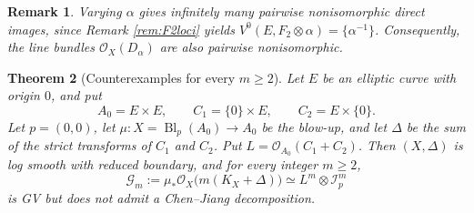 \documentclass[10pt,a4paper]{amsart}
\newtheorem{theorem}{Theorem}[section]
\newtheorem{remark}[theorem]{Remark}
\newcommand{\OO}{\mathcal O}
\newcommand{\GG}{\mathcal G}
\newcommand{\II}{\mathcal I}
\DeclareMathOperator{\Bl}{Bl}
\begin{document}
\begin{remark}
Varying $\alpha$ gives infinitely many pairwise nonisomorphic direct images, since Remark \ref{rem:F2loci} yields $V^0(E,F_2\otimes\alpha)=\{\alpha^{-1}\}$. Consequently, the line bundles $\OO_X(D_\alpha)$ are also pairwise nonisomorphic.
\end{remark}

\begin{theorem}[Counterexamples for every $m\ge2$]\label{thm:pluri}
Let $E$ be an elliptic curve with origin $0$, and put
\[
A_0=E\times E,\qquad C_1=\{0\}\times E,\qquad C_2=E\times\{0\}.
\]
Let $p=(0,0)$, let $\mu:X=\Bl_p(A_0)\to A_0$ be the blow-up, and let $\Delta$ be the sum of the strict transforms of $C_1$ and $C_2$. Put $L=\OO_{A_0}(C_1+C_2)$. Then $(X,\Delta)$ is log smooth with reduced boundary, and for every integer $m\ge2$,
\[
\GG_m:=\mu_*\OO_X\bigl(m(K_X+\Delta)\bigr)\simeq L^m\otimes\II_p^m
\]
is GV but does not admit a Chen--Jiang decomposition.
\end{theorem}
\end{document}

